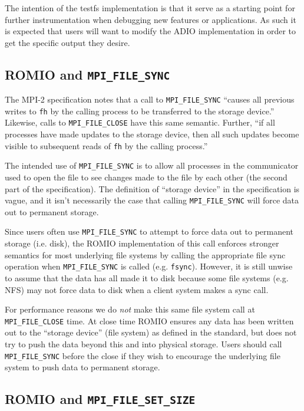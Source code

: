 The intention of the testfs implementation is that it serve as a
starting point for further instrumentation when debugging new features
or applications.  As such it is expected that users will want to modify
the ADIO implementation in order to get the specific output they desire.

\subsection{ROMIO and {\tt MPI\_FILE\_SYNC}}

The MPI-2 specification notes that a call to {\tt MPI\_FILE\_SYNC} ``causes
all previous writes to {\tt fh} by the calling process to be transferred to
the storage device.''  Likewise, calls to {\tt MPI\_FILE\_CLOSE} have this
same semantic.  Further, ``if all processes have made updates to the storage
device, then all such updates become visible to subsequent reads of {\tt fh}
by the calling process.''

The intended use of {\tt MPI\_FILE\_SYNC} is to allow all processes in the
communicator used to open the file to see changes made to the file by each
other (the second part of the specification).  The definition of ``storage
device'' in the specification is vague, and it isn't necessarily the case that
calling {\tt MPI\_FILE\_SYNC} will force data out to permanent storage.

Since users often use {\tt MPI\_FILE\_SYNC} to attempt to force data out to
permanent storage (i.e. disk), the ROMIO implementation of this call enforces
stronger semantics for most underlying file systems by calling the appropriate
file sync operation when {\tt MPI\_FILE\_SYNC} is called (e.g. {\tt fsync}).
However, it is still unwise to assume that the data has all made it to disk
because some file systems (e.g. NFS) may not force data to disk when a client
system makes a sync call.

For performance reasons we do \emph{not} make this same file system call at
{\tt MPI\_FILE\_CLOSE} time.  At close time ROMIO ensures any data has been
written out to the ``storage device'' (file system) as defined in the
standard, but does not try to push the data beyond this and into physical
storage. Users should call {\tt MPI\_FILE\_SYNC} before the close if they wish
to encourage the underlying file system to push data to permanent storage.

\subsection{ROMIO and {\tt MPI\_FILE\_SET\_SIZE}}

